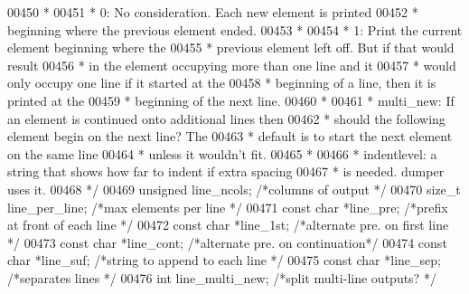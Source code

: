 \begin{DoxyCode}
{{{{{{{{{{{{{{{{{{{00450 \textcolor{comment}{     *}
00451 \textcolor{comment}{     *              0:  No consideration. Each new element is printed}
00452 \textcolor{comment}{     *                  beginning where the previous element ended.}
00453 \textcolor{comment}{     *}
00454 \textcolor{comment}{     *              1:  Print the current element beginning where the}
00455 \textcolor{comment}{     *                  previous element left off. But if that would result}
00456 \textcolor{comment}{     *                  in the element occupying more than one line and it}
00457 \textcolor{comment}{     *                  would only occupy one line if it started at the}
00458 \textcolor{comment}{     *                  beginning of a line, then it is printed at the}
00459 \textcolor{comment}{     *                  beginning of the next line.}
00460 \textcolor{comment}{     *}
00461 \textcolor{comment}{     *   multi\_new: If an element is continued onto additional lines then}
00462 \textcolor{comment}{     *              should the following element begin on the next line? The}
00463 \textcolor{comment}{     *              default is to start the next element on the same line}
00464 \textcolor{comment}{     *              unless it wouldn't fit.}
00465 \textcolor{comment}{     *}
00466 \textcolor{comment}{     * indentlevel: a string that shows how far to indent if extra spacing}
00467 \textcolor{comment}{     *              is needed. dumper uses it.}
00468 \textcolor{comment}{     */}
00469     \textcolor{keywordtype}{unsigned}    line\_ncols;             \textcolor{comment}{/*columns of output             */}
00470     \textcolor{keywordtype}{size\_t}      line\_per\_line;          \textcolor{comment}{/*max elements per line         */}
00471     \textcolor{keyword}{const} \textcolor{keywordtype}{char}  *line\_pre;              \textcolor{comment}{/*prefix at front of each line  */}
00472     \textcolor{keyword}{const} \textcolor{keywordtype}{char}  *line\_1st;              \textcolor{comment}{/*alternate pre. on first line  */}
00473     \textcolor{keyword}{const} \textcolor{keywordtype}{char}  *line\_cont;             \textcolor{comment}{/*alternate pre. on continuation*/}
00474     \textcolor{keyword}{const} \textcolor{keywordtype}{char}  *line\_suf;              \textcolor{comment}{/*string to append to each line */}
00475     \textcolor{keyword}{const} \textcolor{keywordtype}{char}  *line\_sep;              \textcolor{comment}{/*separates lines               */}
00476     \textcolor{keywordtype}{int}         line\_multi\_new;         \textcolor{comment}{/*split multi-line outputs?     */}
}}}}}}}}}}}}}}}}}}}
\end{DoxyCode}
